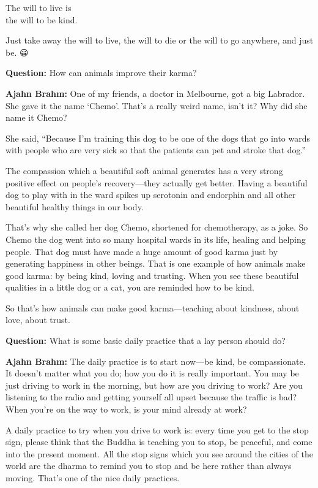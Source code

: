 \documentclass[12pt, openany]{book}
\newenvironment{aphorism}%
{%
\begin{center}\begin{itshape}
}%
{\end{itshape}\end{center}
}%
\begin{document}
\begin{aphorism}
The will to live is\\  
the will to be kind.
\end{aphorism}

Just take away the will to live, the will to die or the will to go anywhere, and just be. 😀 

\textbf{Question:} How can animals improve their karma? 

\textbf{Ajahn Brahm:} One of my friends, a doctor in Melbourne, got a big Labrador. She gave it the name ‘Chemo’. That’s a really weird name, isn’t it? Why did she name it Chemo? 

She said, “Because I’m training this dog to be one of the dogs that go into wards with people who are very sick so that the patients can pet and stroke that dog.” 

The compassion which a beautiful soft animal generates has a very strong positive effect on people’s recovery—they actually get better. Having a beautiful dog to play with in the ward spikes up serotonin and endorphin and all other beautiful healthy things in our body. 

That’s why she called her dog Chemo, shortened for chemo\-therapy, as a joke. So Chemo the dog went into so many hospital wards in its life, healing and helping people. That dog must have made a huge amount of good karma just by generating happiness in other beings. That is one example of how animals make good karma: by being kind, loving and trusting. When you see these beautiful qualities in a little dog or a cat, you are reminded how to be kind. 

So that’s how animals can make good karma—teaching about kindness, about love, about trust. 

\textbf{Question:} What is some basic daily practice that a lay person should do? 

\textbf{Ajahn Brahm:} The daily practice is to start now—be kind, be compassionate. It doesn’t matter what you do; how you do it is really important. You may be just driving to work in the morning, but how are you driving to work? Are you listening to the radio and getting yourself all upset because the traffic is bad? When you’re on the way to work, is your mind already at work? 

A daily practice to try when you drive to work is: every time you get to the stop sign, please think that the Buddha is teaching you to stop, be peaceful, and come into the present moment. All the stop signs which you see around the cities of the world are the dharma to remind you to stop and be here rather than always moving. That’s one of the nice daily practices. 
\end{document}
